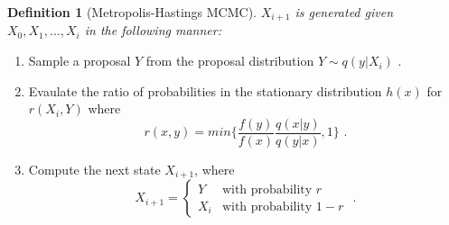 \documentclass[
  12pt,
]{book}
\theoremstyle{definition}
\newtheorem{definition}{Definition}[chapter]
\theoremstyle{definition}
\theoremstyle{definition}
\theoremstyle{remark}
\begin{document}
\begin{definition}[Metropolis-Hastings MCMC]
\protect\hypertarget{def:methas}{}{\label{def:methas} {} }\emph{\(X_{i+1}\) is generated given \(X_{0},X_{1},...,X_{i}\) in the following manner:}

\begin{enumerate}
  \item Sample a proposal $Y$ from the proposal distribution $Y \sim q(y|X_{i}) \textrm{ .}$
  \item Evaulate the ratio of probabilities in the stationary distribution $h(x)$ for $r(X_{i},Y)$ where $$ r(x,y)=min \{\frac{f(y)}{f(x)} \frac{q(x|y)}{q(y|x)} ,1 \} \textrm{ .}$$
  \item Compute the next state $X_{i+1}$, where $$X_{i+1}=\begin{cases}Y & \textrm{with probability }r \\ X_{i} & \textrm{with probability }1-r \end{cases} \textrm{ .}$$
\end{enumerate}
\end{definition}
\end{document}
